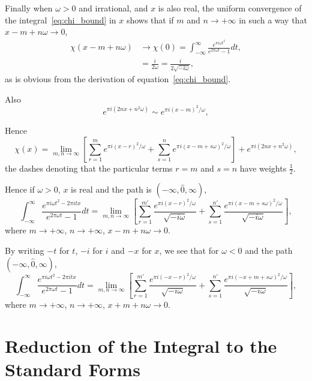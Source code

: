 \documentclass[12pt]{article}
\theoremstyle{remark}
\begin{document}
Finally when $\omega > 0$ and irrational, and $x$ is also real, the uniform convergence of the integral~\eqref{eq:chi_bound} in $x$ shows that if $m$ and $n \to +\infty$ in such a way that $x - m + n\omega \to 0$,
\begin{align}
\chi(x - m + n\omega) &\to \chi(0) = \int_{-\infty}^\infty \frac{e^{\pi i\omega t^2}}{e^{2\pi\omega t} - 1} dt, \label{eq:limit1}\\
&= \frac{i}{2\omega} = \frac{i}{2\sqrt{-i\omega}}, \label{eq:limit2}
\end{align}
as is obvious from the derivation of equation~\eqref{eq:chi_bound}.

Also
\begin{equation}\label{eq:exponential_limit}
e^{\pi i(2nx + n^2\omega)} \sim e^{\pi i(x-m)^2/\omega},
\end{equation}

Hence
\begin{equation}\label{eq:final_limit}
\chi(x) = \lim_{m,n \to \infty} \left[ \sum_{r=1}^m e^{\pi i(x-r)^2/\omega} + \sum_{s=1}^n e^{\pi i(x-m+s\omega)^2/\omega} \right] + e^{\pi i(2nx + n^2\omega)},
\end{equation}
the dashes denoting that the particular terms $r = m$ and $s = n$ have weights $\frac{1}{2}$.

Hence if $\omega > 0$, $x$ is real and the path is $(-\infty, \hat{0}, \infty)$,
\begin{equation}\label{eq:irrational_formula}
\int_{-\infty}^\infty \frac{e^{\pi i\omega t^2 - 2\pi itx}}{e^{2\pi\omega t} - 1} dt = \lim_{m,n \to \infty} \left[ \sum_{r=1}^{m'} \frac{e^{\pi i(x-r)^2/\omega}}{\sqrt{-i\omega}} + \sum_{s=1}^{n'} \frac{e^{\pi i(x-m+s\omega)^2/\omega}}{\sqrt{-i\omega}} \right],
\end{equation}
where $m \to +\infty$, $n \to +\infty$, $x - m + n\omega \to 0$.

By writing $-t$ for $t$, $-i$ for $i$ and $-x$ for $x$, we see that for $\omega < 0$ and the path $(-\infty, \hat{0}, \infty)$,
\begin{equation}\label{eq:negative_omega_formula}
\int_{-\infty}^\infty \frac{e^{\pi i\omega t^2 - 2\pi itx}}{e^{2\pi\omega t} - 1} dt = \lim_{m,n \to \infty} \left[ \sum_{r=1}^{m'} \frac{e^{\pi i(-x-r)^2/\omega}}{\sqrt{-i\omega}} + \sum_{s=1}^{n'} \frac{e^{\pi i(-x+m+s\omega)^2/\omega}}{\sqrt{-i\omega}} \right],
\end{equation}
where $m \to +\infty$, $n \to +\infty$, $x + m + n\omega \to 0$.

\section{Reduction of the Integral to the Standard Forms}\label{sec:standard_forms}
\end{document}
